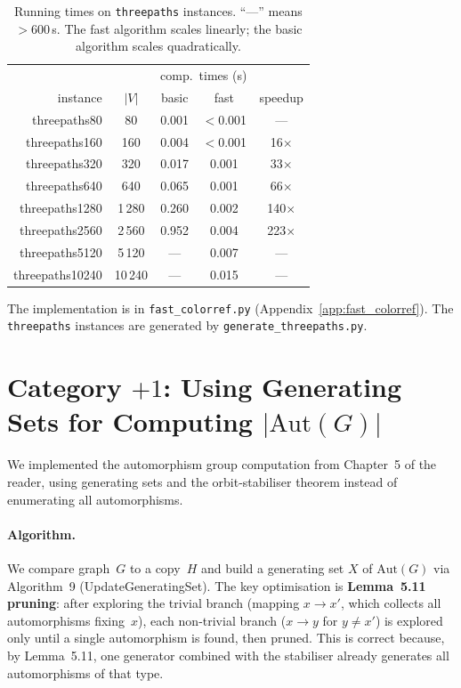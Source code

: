 \documentclass[twoside]{article}
\begin{document}
\begin{table}[H]
\centering
\begin{tabular}{r|c|c|c|c}
&&\multicolumn{2}{c|}{comp.\ times (s)} & \\
instance & $|V|$ & basic & fast & speedup \\
\noalign{\smallskip}\hline\hline\noalign{\smallskip}
threepaths80   &    80 & 0.001 & $<$0.001 & --- \\
threepaths160  &   160 & 0.004 & $<$0.001 & 16$\times$ \\
threepaths320  &   320 & 0.017 & 0.001 & 33$\times$ \\
threepaths640  &   640 & 0.065 & 0.001 & 66$\times$ \\
threepaths1280 & 1\,280 & 0.260 & 0.002 & 140$\times$ \\
threepaths2560 & 2\,560 & 0.952 & 0.004 & 223$\times$ \\
threepaths5120 & 5\,120 & --- & 0.007 & --- \\
threepaths10240 & 10\,240 & --- & 0.015 & --- \\
\end{tabular}
\caption{Running times on \texttt{threepaths} instances. ``---'' means $>600$\,s. The fast algorithm scales linearly; the basic algorithm scales quadratically.}
\label{tab:threepaths}
\end{table}

The implementation is in \texttt{fast\_colorref.py} (Appendix~\ref{app:fast_colorref}). The \texttt{threepaths} instances are generated by \texttt{generate\_threepaths.py}.

\section{Category $+1$: Using Generating Sets for Computing $|\text{Aut}(G)|$}

We implemented the automorphism group computation from Chapter~5 of the reader, using generating sets and the orbit-stabiliser theorem instead of enumerating all automorphisms.

\paragraph{Algorithm.}
We compare graph~$G$ to a copy~$H$ and build a generating set $X$ of $\text{Aut}(G)$ via Algorithm~9 (UpdateGeneratingSet). The key optimisation is \textbf{Lemma~5.11 pruning}: after exploring the trivial branch (mapping $x \to x'$, which collects all automorphisms fixing~$x$), each non-trivial branch ($x \to y$ for $y \ne x'$) is explored only until a single automorphism is found, then pruned. This is correct because, by Lemma~5.11, one generator combined with the stabiliser already generates all automorphisms of that type.
\end{document}
